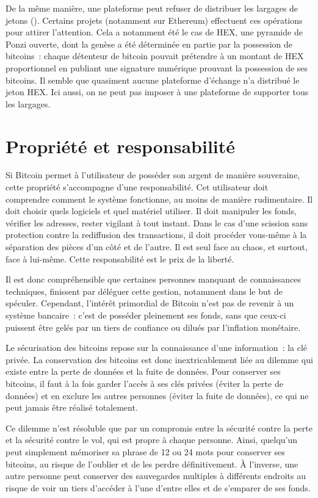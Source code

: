 De la même manière, une plateforme peut refuser de distribuer les largages de jetons (). Certains projets (notamment sur Ethereum) effectuent ces opérations pour attirer l'attention. Cela a notamment été le cas de HEX, une pyramide de Ponzi ouverte, dont la genèse a été déterminée en partie par la possession de bitcoins~: chaque détenteur de bitcoin pouvait prétendre à un montant de HEX proportionnel en publiant une signature numérique prouvant la possession de ses bitcoins. Il semble que quasiment aucune plateforme d'échange n'a distribué le jeton HEX. Ici aussi, on ne peut pas imposer à une plateforme de supporter tous les largages. 

\section{Propriété et responsabilité}

Si Bitcoin permet à l'utilisateur de posséder son argent de manière souveraine, cette propriété s'accompagne d'une responsabilité. Cet utilisateur doit comprendre comment le système fonctionne, au moins de manière rudimentaire. Il doit choisir quels logiciels et quel matériel utiliser. Il doit manipuler les fonds, vérifier les adresses, rester vigilant à tout instant. Dans le cas d'une scission sans protection contre la rediffusion des transactions, il doit procéder vous-même à la séparation des pièces d'un côté et de l'autre. Il est seul face au chaos, et surtout, face à lui-même. Cette responsabilité est le prix de la liberté.

Il est donc compréhensible que certaines personnes manquant de connaissances techniques, finissent par déléguer cette gestion, notamment dans le but de spéculer. Cependant, l'intérêt primordial de Bitcoin n'est pas de revenir à un système bancaire~: c'est de posséder pleinement ses fonds, sans que ceux-ci puissent être gelés par un tiers de confiance ou dilués par l'inflation monétaire. 

Le sécurisation des bitcoins repose sur la connaissance d'une information~: la clé privée. La conservation des bitcoins est donc inextricablement liée au dilemme qui existe entre la perte de données et la fuite de données. Pour conserver ses bitcoins, il faut à la fois garder l'accès à ses clés privées (éviter la perte de données) et en exclure les autres personnes (éviter la fuite de données), ce qui ne peut jamais être réalisé totalement.

Ce dilemme n'est résoluble que par un compromis entre la sécurité contre la perte et la sécurité contre le vol, qui est propre à chaque personne. Ainsi, quelqu'un peut simplement mémoriser sa phrase de 12 ou 24 mots pour conserver ses bitcoins, au risque de l'oublier et de les perdre définitivement. À l'inverse, une autre personne peut conserver des sauvegardes multiples à différents endroits au risque de voir un tiers d'accéder à l'une d'entre elles et de s'emparer de ses fonds.

